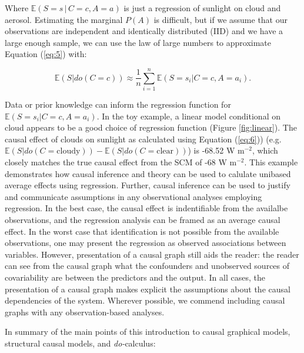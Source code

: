 \documentclass[12pt]{article}
\begin{document}
Where $\mathbb{E}(S=s \, | \, C=c, A=a)$ is just a regression of sunlight on
cloud and aerosol. Estimating the marginal $P(A)$ is difficult, but
if we assume that our observations are independent and identically
distributed (IID) and we have a large enough sample, we can use the
law of large numbers to approximate Equation (\ref{eq:5}) with:

\begin{equation}
  \mathbb{E}(S | do(C = c))  \approx \frac{1}{n} \sum_{i=1}^n \mathbb{E}(S=s_i |
  C=c, A=a_i).
  \label{eq:6}
\end{equation}

Data or prior knowledge can inform the regression function for
$\mathbb{E}(S=s_i | C=c, A=a_i)$. In the toy example, a linear model
conditional on cloud appears to be a good choice of regression
function (Figure \ref{fig:linear}). The causal effect of clouds on
sunlight as calculated using Equation (\ref{eq:6})) (e.g.
$\mathbb{E}(S | do(C = \text{cloudy})) - \mathbb{E}(S | do(C =
\text{clear}))$) is -68.52 W m$^{-2}$, which closely matches the true
causal effect from the SCM of -68 W m$^{-2}$. This example
demonstrates how causal inference and theory can be used to calulate
unibased average effects using regression. Further, causal inference
can be used to justify and communicate assumptions in any
observational analyses employing regression. In the best case, the
causal effect is indentifiable from the availalbe observations, and
the regression analysis can be framed as an average causal effect. In
the worst case that identification is not possible from the available
observations, one may present the regression as observed associations
between variables. However, presentation of a causal graph still aids
the reader: the reader can see from the causal graph what the
confounders and unobserved sources of covariability are between the
predictors and the output. In all cases, the presentation of a causal
graph makes explicit the assumptions about the causal dependencies of
the system. Wherever possible, we commend including causal graphs with
any observation-based analyses.

In summary of the main points of this introduction to causal graphical
models, structural causal models, and \textit{do-}calculus:
\end{document}
